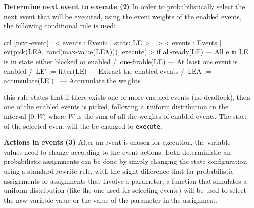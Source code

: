 \textbf{Determine next event to execute (2)} In order to probabilistically select the next event that will be executed, using the event weights of the enabled events, the following conditional rule is used:
\\
\begin{maude}
crl [next-event] :  < events : Events | state: LE > => 
                    < events : Events | ev(pick(LEA,
                      rand(max-value(LEA))), execute) >
if     all-ready(LE) --- All e in LE is in state either blocked or enabled 
   /\  one-firable(LE) --- At least one event is enabled 
   /\  LE' := filter(LE) --- Extract the enabled events
   /\  LEA := accumulate(LE') . --- Accumulate the weights 
\end{maude}
this rule states that if there exists one or more enabled events (no deadlock), then one of the enabled events is picked, following a uniform distribution on the interval $[0, W)$ where $W$ is the sum of all the weights of enabled events. The state of the selected event will the be changed to \texttt{execute}.

\textbf{Actions in events (3)} After an event is chosen for execution, the variable values need to change according to the event actions. Both deterministic an probabilistic assignments can be done  by simply changing the state configuration using a standard rewrite rule, with the slight difference that for probabilistic assignments or assignments that involve a parameter, a function that simulates a uniform distribution (like the one used for selecting events) will be used to select the new variable value or the value of the parameter in the assignment.









